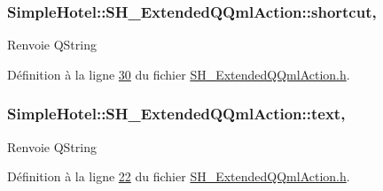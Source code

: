 \hypertarget{classSimpleHotel_1_1SH__ExtendedQQmlAction_a66dd0d938ca4bbf2a69ec3e5f2c9cb3b}{
\subsubsection[{shortcut}]{\setlength{\rightskip}{0pt plus 5cm}Simple\-Hotel\-::\-S\-H\-\_\-\-Extended\-Q\-Qml\-Action\-::shortcut\hspace{0.3cm}{\ttfamily [read]}, {\ttfamily [write]}}}\label{classSimpleHotel_1_1SH__ExtendedQQmlAction_a66dd0d938ca4bbf2a69ec3e5f2c9cb3b}
\begin{DoxyReturn}{Renvoie}
Q\-String 
\end{DoxyReturn}


Définition à la ligne \hyperlink{SH__ExtendedQQmlAction_8h_source_l00030}{30} du fichier \hyperlink{SH__ExtendedQQmlAction_8h_source}{S\-H\-\_\-\-Extended\-Q\-Qml\-Action.\-h}.

\hypertarget{classSimpleHotel_1_1SH__ExtendedQQmlAction_a258fdf949b62536b794a0a01b4f9a2a1}{
\subsubsection[{text}]{\setlength{\rightskip}{0pt plus 5cm}Simple\-Hotel\-::\-S\-H\-\_\-\-Extended\-Q\-Qml\-Action\-::text\hspace{0.3cm}{\ttfamily [read]}, {\ttfamily [write]}}}\label{classSimpleHotel_1_1SH__ExtendedQQmlAction_a258fdf949b62536b794a0a01b4f9a2a1}
\begin{DoxyReturn}{Renvoie}
Q\-String 
\end{DoxyReturn}


Définition à la ligne \hyperlink{SH__ExtendedQQmlAction_8h_source_l00022}{22} du fichier \hyperlink{SH__ExtendedQQmlAction_8h_source}{S\-H\-\_\-\-Extended\-Q\-Qml\-Action.\-h}.

